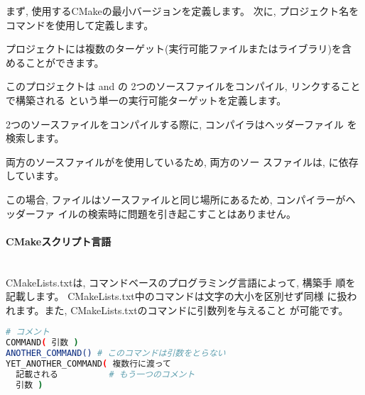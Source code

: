 \documentclass[uplatex,11pt,a4paper,landscape,dvipdfmx]{jsarticle} %
\newcommand{\sectiontitle}[1]{\paragraph{#1} \ \\} %
\begin{document}
\begin{multicols}{2}
まず, 使用するCMakeの最小バージョンを定義します。
次に, プロジェクト名をコマンドを使用して定義します。

プロジェクトには複数のターゲット(実行可能ファイルまたはライブラリ)を含
めることができます。

このプロジェクトは and の
2つのソースファイルをコンパイル, リンクすることで構築される
という単一の実行可能ターゲットを定義します。


2つのソースファイルをコンパイルする際に, コンパイラはヘッダーファイル
を検索します。 

両方のソースファイルがを使用しているため, 両方のソー
スファイルは, に依存しています。

この場合, ファイルはソースファイルと同じ場所にあるため, コンパイラーがヘッダーファ
イルの検索時に問題を引き起こすことはありません。

\sectiontitle{CMakeスクリプト言語}


CMakeLists.txtは, コマンドベースのプログラミング言語によって, 構築手
順を記載します。 CMakeLists.txt中のコマンドは文字の大小を区別せず同様
に扱われます。また, CMakeLists.txtのコマンドに引数列を与えること
が可能です。

\begin{lstlisting}[language=bash]
# コメント
COMMAND( 引数 )
ANOTHER_COMMAND() # このコマンドは引数をとらない
YET_ANOTHER_COMMAND( 複数行に渡って
  記載される          # もう一つのコメント
  引数 )
\end{lstlisting}



\end{multicols}
\end{document}
